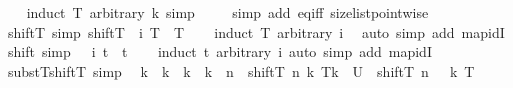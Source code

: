 \begin{isabellebody}
%
\isadelimproof
\ \ %
\endisadelimproof
%
\isatagproof
{}\isamarkupfalse%
\ {\isacharparenleft}{\kern0pt}induct\ T\ arbitrary{\isacharcolon}{\kern0pt}\ k{\isacharsemicolon}{\kern0pt}\ simp{\isacharparenright}{\kern0pt}\ \isanewline
\ \ \isamarkupfalse%
\ {\isacharparenleft}{\kern0pt}simp\ add{\isacharcolon}{\kern0pt}\ eq{\isacharunderscore}{\kern0pt}iff\ size{\isacharunderscore}{\kern0pt}list{\isacharunderscore}{\kern0pt}pointwise{\isacharparenright}{\kern0pt}%
\endisatagproof
{\isafoldproof}%
%
\isadelimproof
\isanewline
%
\endisadelimproof
\isanewline
{}\isamarkupfalse%
\ shiftT{}\ {\isacharbrackleft}{\kern0pt}simp{\isacharbrackright}{\kern0pt}{\isacharcolon}{\kern0pt}\ {\isachardoublequoteopen}shiftT\ {}\ i\ T\ {\isacharequal}{\kern0pt}\ T{\isachardoublequoteclose}\isanewline
%
\isadelimproof
\ \ %
\endisadelimproof
%
\isatagproof
{}\isamarkupfalse%
\ {\isacharparenleft}{\kern0pt}induct\ T\ arbitrary{\isacharcolon}{\kern0pt}\ i{\isacharparenright}{\kern0pt}\ \isamarkupfalse%
\ {\isacharparenleft}{\kern0pt}auto\ simp\ add{\isacharcolon}{\kern0pt}\ map{\isacharunderscore}{\kern0pt}idI{\isacharparenright}{\kern0pt}%
\endisatagproof
{\isafoldproof}%
%
\isadelimproof
\isanewline
%
\endisadelimproof
\isanewline
{}\isamarkupfalse%
\ shift{}\ {\isacharbrackleft}{\kern0pt}simp{\isacharbrackright}{\kern0pt}{\isacharcolon}{\kern0pt}\ {\isachardoublequoteopen}{\isasymup}\ {}\ i\ t\ {\isacharequal}{\kern0pt}\ t{\isachardoublequoteclose}\isanewline
%
\isadelimproof
\ \ %
\endisadelimproof
%
\isatagproof
{}\isamarkupfalse%
\ {\isacharparenleft}{\kern0pt}induct\ t\ arbitrary{\isacharcolon}{\kern0pt}\ i{\isacharparenright}{\kern0pt}\ {\isacharparenleft}{\kern0pt}auto\ simp\ add{\isacharcolon}{\kern0pt}\ map{\isacharunderscore}{\kern0pt}idI{\isacharparenright}{\kern0pt}%
\endisatagproof
{\isafoldproof}%
%
\isadelimproof
\isanewline
%
\endisadelimproof
\isanewline
{}\isamarkupfalse%
\ substT{\isacharunderscore}{\kern0pt}shiftT\ {\isacharbrackleft}{\kern0pt}simp{\isacharbrackright}{\kern0pt}{\isacharcolon}{\kern0pt}\isanewline
\ \ {\isachardoublequoteopen}k\ {\isasymle}\ k{\isacharprime}{\kern0pt}\ {\isasymLongrightarrow}\ k{\isacharprime}{\kern0pt}\ {\isacharless}{\kern0pt}\ k\ {\isacharplus}{\kern0pt}\ n\ {\isasymLongrightarrow}\ {\isacharparenleft}{\kern0pt}shiftT\ n\ k\ T{\isacharparenright}{\kern0pt}{\isacharbrackleft}{\kern0pt}k{\isacharprime}{\kern0pt}\ {\isasymmapsto}\isactrlsub {\isasymtau}\ U{\isacharbrackright}{\kern0pt}\isactrlsub {\isasymtau}\ {\isacharequal}{\kern0pt}\ shiftT\ {\isacharparenleft}{\kern0pt}n\ {\isacharminus}{\kern0pt}\ {}{\isacharparenright}{\kern0pt}\ k\ T{\isachardoublequoteclose}\isanewline

\end{isabellebody}

